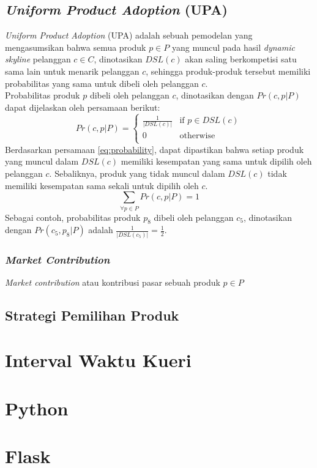 \subsection{\textit{Uniform Product Adoption} (UPA)}
\tab \textit{Uniform Product Adoption} (UPA) adalah sebuah pemodelan yang mengasumsikan bahwa semua produk $p \in P$ yang muncul pada hasil \textit{dynamic skyline} pelanggan $c \in C$, dinotasikan $DSL(c)$ akan saling berkompetisi satu sama lain untuk menarik pelanggan $c$, sehingga produk-produk tersebut memiliki probabilitas yang sama untuk dibeli oleh pelanggan $c$.\\
\tab Probabilitas produk $p$ dibeli oleh pelanggan $c$, dinotasikan dengan $Pr(c, p|P)$ dapat dijelaskan oleh persamaan berikut:
\begin{equation}\label{eq:probability}
Pr(c, p|P) = \left\{
				\begin{array}{ll}
					\frac{1}{|DSL(c)|} & \text{if } p \in DSL(c)\\
					0 & \text{otherwise}\\
				\end{array}
				\right.
\end{equation}
\tab Berdasarkan persamaan \ref{eq:probability}, dapat dipastikan bahwa setiap produk yang muncul dalam $DSL(c)$ memiliki kesempatan yang sama untuk dipilih oleh pelanggan $c$. Sebaliknya, produk yang tidak muncul dalam $DSL(c)$ tidak memiliki kesempatan sama sekali untuk dipilih oleh $c$.\\
\begin{equation}\label{eq:probability1}
\sum_{\forall p \in P} Pr(c, p|P) = 1
\end{equation}
\tab Sebagai contoh, probabilitas produk $p_8$ dibeli oleh pelanggan $c_5$, dinotasikan dengan $Pr(c_5, p_8|P)$ adalah $\frac{1}{|DSL(c_5)|} = \frac{1}{2}$.

\subsubsection{\textit{Market Contribution}}
\tab \textit{Market contribution} atau kontribusi pasar sebuah produk $p \in P$

\subsection{Strategi Pemilihan Produk}

\section{Interval Waktu Kueri}
\section{Python}
\section{Flask}